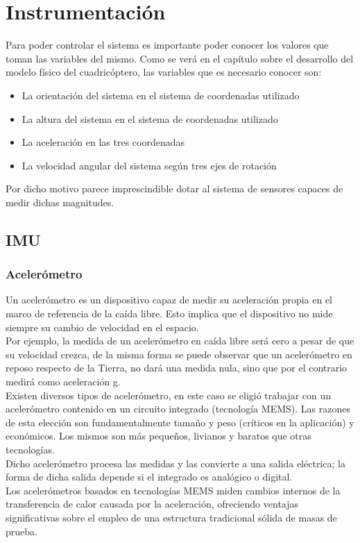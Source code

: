 \documentclass[main]{subfiles}
\begin{document}
\section{Instrumentaci\'on}

Para poder controlar el sistema es importante poder conocer los valores que toman las variables del mismo. Como se ver\'a en el cap\'itulo sobre el desarrollo del modelo f\'isico del cuadric\'optero, las variables que es necesario conocer son:

\begin{itemize}
\item La orientaci\'on del sistema en el sistema de coordenadas utilizado
\item La altura del sistema en el sistema de coordenadas utilizado
\item La aceleraci\'on en las tres coordenadas
\item La velocidad angular del sistema seg\'un tres ejes de rotaci\'on
\end{itemize}

Por dicho motivo parece imprescindible dotar al sistema de sensores capaces de medir dichas magnitudes.
\subsection{IMU}

\subsubsection{Aceler\'ometro}
\label{acelerometro}

Un aceler\'ometro es un dispositivo capaz de medir su aceleraci\'on propia en el marco de referencia de la ca\'ida libre. Esto implica que el dispositivo no mide siempre su cambio de velocidad en el espacio.\\
Por ejemplo, la medida de un aceler\'ometro en ca\'ida libre ser\'a cero a pesar de que su velocidad crezca, de la misma forma se puede observar que un aceler\'ometro en reposo respecto de la Tierra, no dar\'a una medida nula, sino que por el contrario medir\'a como aceleraci\'on g.\\

Existen diversos tipos de aceler\'ometro, en este caso se eligi\'o trabajar con un aceler\'ometro contenido en un circuito integrado (tecnolog\'ia MEMS). Las razones de esta elecci\'on son fundamentalmente tama\~no y peso (cr\'iticos en la aplicaci\'on) y econ\'omicos. Los mismos son m\'as peque\~nos, livianos y baratos que otras tecnolog\'ias.\\
Dicho aceler\'ometro procesa las medidas y las convierte a una salida el\'ectrica; la forma de dicha salida depende si el integrado es anal\'ogico o digital.\\
Los aceler\'ometros basados en tecnolog\'ias MEMS miden cambios internos de la transferencia de calor causada por la aceleraci\'on, ofreciendo ventajas significativas sobre el empleo de una estructura tradicional s\'olida de masas de prueba.\\
\end{document}
